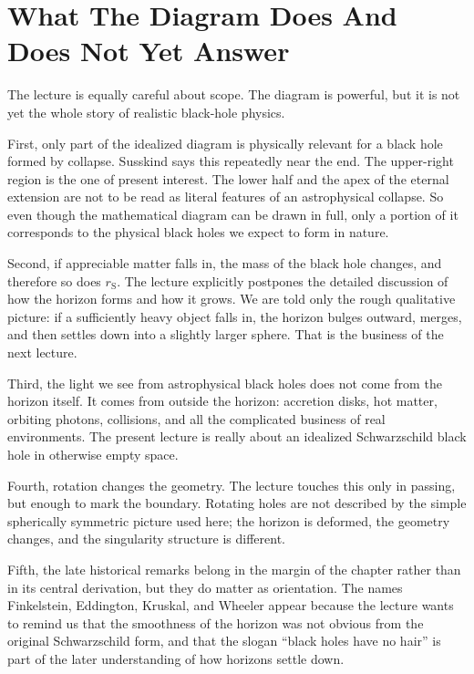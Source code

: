 \section{What The Diagram Does And Does Not Yet Answer}

The lecture is equally careful about scope. The diagram is powerful, but it is not yet the whole story of realistic black-hole physics.

First, only part of the idealized diagram is physically relevant for a black hole formed by collapse. Susskind says this repeatedly near the end. The upper-right region is the one of present interest. The lower half and the apex of the eternal extension are not to be read as literal features of an astrophysical collapse. So even though the mathematical diagram can be drawn in full, only a portion of it corresponds to the physical black holes we expect to form in nature.

Second, if appreciable matter falls in, the mass of the black hole changes, and therefore so does \(r_{\mathrm S}\). The lecture explicitly postpones the detailed discussion of how the horizon forms and how it grows. We are told only the rough qualitative picture: if a sufficiently heavy object falls in, the horizon bulges outward, merges, and then settles down into a slightly larger sphere. That is the business of the next lecture.

Third, the light we see from astrophysical black holes does not come from the horizon itself. It comes from outside the horizon: accretion disks, hot matter, orbiting photons, collisions, and all the complicated business of real environments. The present lecture is really about an idealized Schwarzschild black hole in otherwise empty space.

Fourth, rotation changes the geometry. The lecture touches this only in passing, but enough to mark the boundary. Rotating holes are not described by the simple spherically symmetric picture used here; the horizon is deformed, the geometry changes, and the singularity structure is different.

Fifth, the late historical remarks belong in the margin of the chapter rather than in its central derivation, but they do matter as orientation. The names Finkelstein, Eddington, Kruskal, and Wheeler appear because the lecture wants to remind us that the smoothness of the horizon was not obvious from the original Schwarzschild form, and that the slogan ``black holes have no hair'' is part of the later understanding of how horizons settle down.

